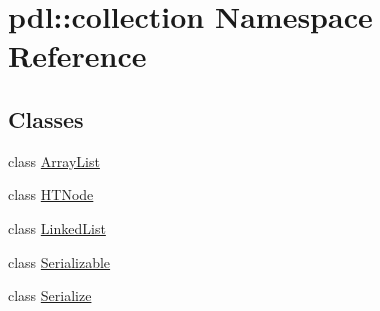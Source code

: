 \hypertarget{namespacepdl_1_1collection}{}\section{pdl\+::collection Namespace Reference}
\label{namespacepdl_1_1collection}
\subsection*{Classes}
\begin{DoxyCompactItemize}
\item 
class \mbox{\hyperlink{classpdl_1_1collection_1_1_array_list}{Array\+List}}
\item 
class \mbox{\hyperlink{classpdl_1_1collection_1_1_h_t_node}{H\+T\+Node}}
\item 
class \mbox{\hyperlink{classpdl_1_1collection_1_1_linked_list}{Linked\+List}}
\item 
class \mbox{\hyperlink{classpdl_1_1collection_1_1_serializable}{Serializable}}
\item 
class \mbox{\hyperlink{classpdl_1_1collection_1_1_serialize}{Serialize}}
\end{DoxyCompactItemize}
